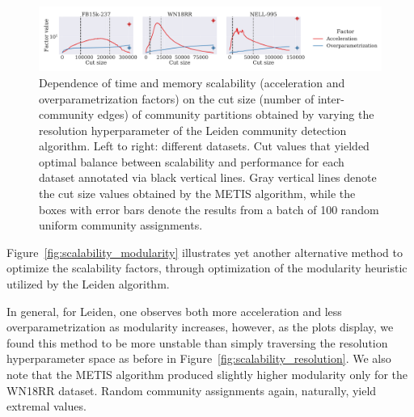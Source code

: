 \begin{figure}[H]
\begin{center}
\includegraphics[width=\textwidth]{figures/coins/scalability_leiden_cut_size}
\end{center}
\caption[Dependence of time and memory scalability on the cut size of community partitions obtained by varying the resolution hyperparameter of the Leiden community detection algorithm.]{Dependence of time and memory scalability (acceleration and overparametrization factors) on the cut size (number of inter-community edges) of community partitions obtained by varying the resolution hyperparameter of the Leiden community detection algorithm. Left to right: different datasets. Cut values that yielded optimal balance between scalability and performance for each dataset annotated via black vertical lines. Gray vertical lines denote the cut size values obtained by the METIS algorithm, while the boxes with error bars denote the results from a batch of 100 random uniform community assignments.}
\label{fig:scalability_cut_size}
\end{figure}

Figure~\ref{fig:scalability_modularity} illustrates yet another alternative method to optimize the scalability factors, through optimization of the modularity heuristic utilized by the Leiden algorithm. 

In general, for Leiden, one observes both more acceleration and less overparametrization as modularity increases, however, as the plots display, we found this method to be more unstable than simply traversing the resolution hyperparameter space as before in Figure~\ref{fig:scalability_resolution}. We also note that the METIS algorithm produced slightly higher modularity only for the WN18RR dataset. Random community assignments again, naturally, yield extremal values.

